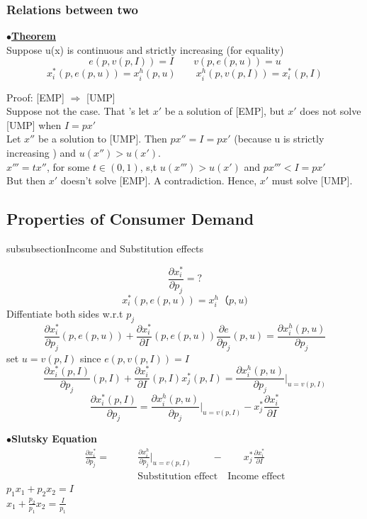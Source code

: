 \documentclass[letterpaper,13pt,single,pdftex]{scrartcl}
\begin{document}
\subsubsection{Relations between two}
$\bullet$\underline{\textbf{Theorem}}
\\Suppose u(x) is continuous and strictly increasing (for equality)
  \[ e(p, v(p,I)) = I \qquad v(p,e(p,u)) = u  \]
 \[x_i^*(p,e(p,u)) = x_i^h(p,u)\qquad x_i^h (p,v(p,I)) = x_i^*(p,I)\]
 
Proof:
[EMP] $\Rightarrow$ [UMP]\\
Suppose not the case. That 's let $x'$ be a solution of [EMP], but $x'$ does not solve [UMP] when $I = px'$\\
Let $x''$ be a solution to [UMP]. Then $px'' = I = px'$ (because u is strictly increasing ) and $u(x'')>u(x')$.\\
$x'''=tx''$, for some $t \in (0,1) $, s,t $u(x''')>u(x')$ and $px'''<I = px'$\\
But then $x'$ doesn't solve [EMP]. A contradiction. Hence, $x'$ must solve [UMP].


\subsection{Properties of Consumer Demand}


subsubsection{Income and Substitution effects}

\[\frac{\partial x_i^*}{\partial p_j}= ?\]
\[x_i^*(p,e(p,u)) = x_i^h（p,u)\]
Diffentiate both sides w.r.t $p_j$
\[\frac{\partial x_i^*}{\partial p_j}(p,e(p,u)) +\frac{\partial x_i^*}{\partial I}(p,e(p,u)) \frac{\partial e}{\partial p_j}(p,u) = \frac{\partial x_i^h (p,u)}{\partial p_j}\]
set $u = v(p,I)$ since $e(p, v(p,I) ) = I$\\
\[\frac{\partial x_i^*(p,I)}{\partial p_j}(p,I) +\frac{\partial x_i^*}{\partial I}(p,I) x_j^*(p,I)= \frac{\partial x_i^h (p,u)}{\partial p_j}|_{u = v(p,I)}\]
\[\frac{\partial x_i^*(p,I)}{\partial p_j} = \frac{\partial x_i^h (p,u)}{\partial p_j}|_{u = v(p,I)} - x_j^*\frac{\partial x_i^*}{\partial I}\]

$\bullet$\textbf{Slutsky Equation}
\begin{align*}
    \frac{\partial x_i^*}{\partial p_j} =\qquad & \frac{\partial x^h_i}{\partial p_j} |_{u = v(p,I)} \qquad -\qquad  x_j^* \frac{\partial x_i^*}{\partial I}\\
    &\text{Substitution effect} \quad \text{Income effect}
\end{align*} 
$p_1x_1 +p_2x_2 = I$\\
$x_1 +\frac{p_2}{p_1} x_2 = \frac{I}{p_1}$\\
\end{document}
